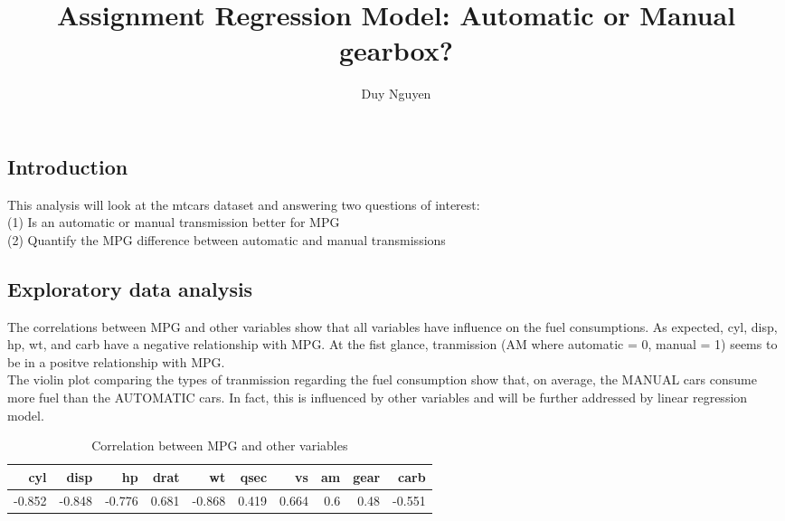 \documentclass[]{article}
\title{Assignment Regression Model: Automatic or Manual gearbox?}
\author{Duy Nguyen}
\date{}
\newenvironment{Shaded}{\begin{snugshade}}{\end{snugshade}}
\newcommand{\KeywordTok}[1]{\textcolor[rgb]{0.13,0.29,0.53}{\textbf{#1}}}
\newcommand{\DataTypeTok}[1]{\textcolor[rgb]{0.13,0.29,0.53}{#1}}
\newcommand{\DecValTok}[1]{\textcolor[rgb]{0.00,0.00,0.81}{#1}}
\newcommand{\StringTok}[1]{\textcolor[rgb]{0.31,0.60,0.02}{#1}}
\newcommand{\OperatorTok}[1]{\textcolor[rgb]{0.81,0.36,0.00}{\textbf{#1}}}
\newcommand{\NormalTok}[1]{#1}
\begin{document}
\maketitle

\subsection{Introduction}\label{introduction}

This analysis will look at the mtcars dataset and answering two
questions of interest:\\
(1) Is an automatic or manual transmission better for MPG\\
(2) Quantify the MPG difference between automatic and manual
transmissions

\subsection{Exploratory data analysis}\label{exploratory-data-analysis}

The correlations between MPG and other variables show that all variables
have influence on the fuel consumptions. As expected, cyl, disp, hp, wt,
and carb have a negative relationship with MPG. At the fist glance,
tranmission (AM where automatic = 0, manual = 1) seems to be in a
positve relationship with MPG.\\
The violin plot comparing the types of tranmission regarding the fuel
consumption show that, on average, the MANUAL cars consume more fuel
than the AUTOMATIC cars. In fact, this is influenced by other variables
and will be further addressed by linear regression model.

\begin{Shaded}
\end{Shaded}

\begin{table}

\caption{\label{tab:unnamed-chunk-1}Correlation between MPG and other variables}
\centering
\begin{tabular}[t]{r|r|r|r|r|r|r|r|r|r}
\hline
cyl & disp & hp & drat & wt & qsec & vs & am & gear & carb\\
\hline
-0.852 & -0.848 & -0.776 & 0.681 & -0.868 & 0.419 & 0.664 & 0.6 & 0.48 & -0.551\\
\hline
\end{tabular}
\end{table}
\end{document}

